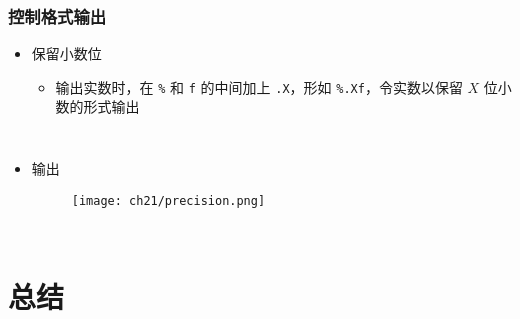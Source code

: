 \begin{frame}[fragile]
    \frametitle{控制格式输出}

    \begin{itemize}
       \item 保留小数位
        \begin{itemize}
           \item 输出实数时，在 \lstinline|%| 和 \lstinline|f| 的中间加上 \lstinline|.X|，形如 \lstinline|%.Xf|，令实数以保留 $X$ 位小数的形式输出
        \end{itemize}
    \end{itemize}

   \begin{columns}

        

        \begin{itemize}
           \item 输出
            \begin{figure}
                \texttt{[image: ch21/precision.png]}
            \end{figure}
            
        \end{itemize}
   \end{columns}
    
\end{frame}

\section{总结}

